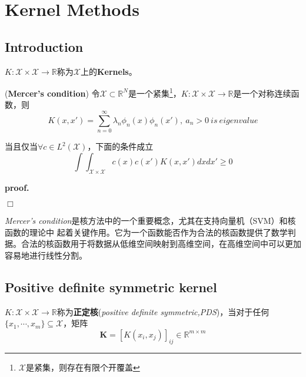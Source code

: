 \chapter{Kernel Methods}

\section{Introduction}

$K:\mathcal{X}\times \mathcal{X}\rightarrow \mathbb{R}$称为$\mathcal{X}$上的\textbf{Kernels}。

\begin{mdframed}
    \begin{theorem}
        (\textbf{Mercer's condition})\hspace{0.4em} 令$\mathcal{X}\subset \mathbb{R}^N$是一个紧集\footnote{$\mathcal{X}$是紧集，则存在有限个开覆盖}，$K:\mathcal{X}\times \mathcal{X}\rightarrow \mathbb{R}$是一个对称连续函数，则
        \begin{equation}
            K(x,x')=\sum_{n=0}^{\infty} \lambda_n\phi_n(x)\phi_n(x'),\ a_n>0 \ is \ eigenvalue
        \end{equation}

        当且仅当$\forall c\in L^2(\mathcal{X})$，下面的条件成立
        \begin{equation}
            \int\int_{\mathcal{X}\times\mathcal{X}}c(x)c(x')K(x,x')dxdx'\geqslant 0
        \end{equation}
    \end{theorem}
\end{mdframed}

\textbf{proof.}\hspace{0.5em} 

$\Box$

\textsl{Mercer’s condition}是核方法中的一个重要概念，尤其在支持向量机（SVM）和核函数的理论中
起着关键作用。它为一个函数能否作为合法的核函数提供了数学判据。合法的核函数用于将数据从低维空间映射到高维空间，在高维空间中可以更加容易地进行线性分割。

\section{Positive definite symmetric kernel}

$K:\mathcal{X}\times \mathcal{X}\rightarrow \mathbb{R}$称为\textbf{正定核}(\textsl{positive definite symmetric,PDS})，当对于任何$\{x_1,\cdots,x_m\}\subseteq \mathcal{X}$，矩阵
\begin{equation}
    \mathbf{K}=\left[ K(x_i,x_j) \right]_{ij}\in \mathbb{R}^{m\times m}
\end{equation}

